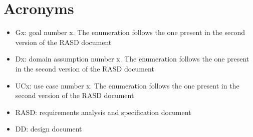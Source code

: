 \section{Acronyms}
\begin{itemize}
\item Gx: goal number x. The enumeration follows the one present in the second
version of the RASD document

\item Dx: domain assumption number x. The enumeration follows the one present in the
second version of the RASD document

\item UCx: use case number x. The enumeration follows the one present in the second
version of the RASD document

\item RASD: requirements analysis and specification document

\item DD: design document

\end{itemize}
